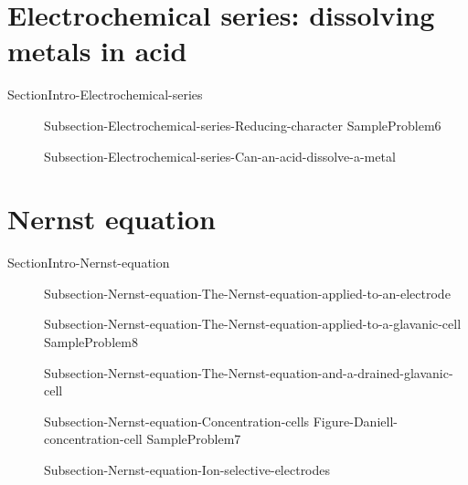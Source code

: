 \documentclass[main.tex]{subfiles}
\begin{document}
\section{Electrochemical series: dissolving metals in acid}{SectionIntro-Electrochemical-series}
\sloppy\begin{description}
   \item[] {Subsection-Electrochemical-series-Reducing-character}
  {SampleProblem6}
\item[] {Subsection-Electrochemical-series-Can-an-acid-dissolve-a-metal}
\end{description}


\section{Nernst equation}{SectionIntro-Nernst-equation}
\sloppy\begin{description}
   \item[] {Subsection-Nernst-equation-The-Nernst-equation-applied-to-an-electrode}
   \item[] {Subsection-Nernst-equation-The-Nernst-equation-applied-to-a-glavanic-cell}
     {SampleProblem8}
   \item[] {Subsection-Nernst-equation-The-Nernst-equation-and-a-drained-glavanic-cell}
   \item[] {Subsection-Nernst-equation-Concentration-cells}
{Figure-Daniell-concentration-cell}
  {SampleProblem7}
   \item[] {Subsection-Nernst-equation-Ion-selective-electrodes}
\end{description}
 
\end{document}
